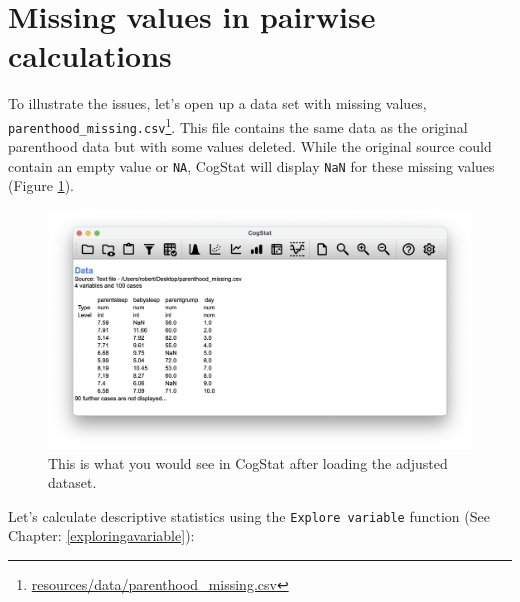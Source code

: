 \documentclass[
  11pt,
  a4paper,
  twoside,symmetric,openright]{book}
\theoremstyle{break}
\theoremstyle{break}
\DeclareRobustCommand{\href}[2]{#2\footnote{\url{#1}}}
\begin{document}
\section{Missing values in pairwise calculations}\label{missingvaluespair}

To illustrate the issues, let's open up a data set with missing values, \href{resources/data/parenthood_missing.csv}{\texttt{parenthood\_missing.csv}}. This file contains the same data as the original parenthood data but with some values deleted. While the original source could contain an empty value or \texttt{NA}, CogStat will display \texttt{NaN} for these missing values (Figure \ref{fig:parenthoodmissing}).

\begin{figure}

{\centering \includegraphics[width=0.6\linewidth]{resources/image/cogstatparenthood_missing} 

}

\caption{This is what you would see in CogStat after loading the adjusted dataset.}\label{fig:parenthoodmissing}
\end{figure}

Let's calculate descriptive statistics using the \texttt{Explore\ variable} function (See Chapter: \ref{exploringavariable}):
\end{document}
